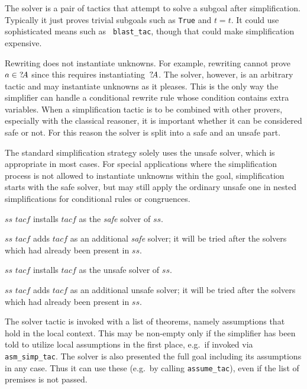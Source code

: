 The solver is a pair of tactics that attempt to solve a subgoal after
simplification.  Typically it just proves trivial subgoals such as
\texttt{True} and $t=t$.  It could use sophisticated means such as {\tt
  blast_tac}, though that could make simplification expensive.

Rewriting does not instantiate unknowns.  For example, rewriting
cannot prove $a\in {?\!A}$ since this requires
instantiating~${?\!A}$.  The solver, however, is an arbitrary tactic
and may instantiate unknowns as it pleases.  This is the only way the
simplifier can handle a conditional rewrite rule whose condition
contains extra variables.  When a simplification tactic is to be
combined with other provers, especially with the classical reasoner,
it is important whether it can be considered safe or not.  For this
reason the solver is split into a safe and an unsafe part.

The standard simplification strategy solely uses the unsafe solver,
which is appropriate in most cases.  For special applications where
the simplification process is not allowed to instantiate unknowns
within the goal, simplification starts with the safe solver, but may
still apply the ordinary unsafe one in nested simplifications for
conditional rules or congruences.

\begin{ttdescription}
  
\item[$ss$ \ttindexbold{setSSolver} $tacf$] installs $tacf$ as the
  \emph{safe} solver of $ss$.
  
\item[$ss$ \ttindexbold{addSSolver} $tacf$] adds $tacf$ as an
  additional \emph{safe} solver; it will be tried after the solvers
  which had already been present in $ss$.
  
\item[$ss$ \ttindexbold{setSolver} $tacf$] installs $tacf$ as the
  unsafe solver of $ss$.
  
\item[$ss$ \ttindexbold{addSolver} $tacf$] adds $tacf$ as an
  additional unsafe solver; it will be tried after the solvers which
  had already been present in $ss$.

\end{ttdescription}

\medskip

 The solver tactic is invoked
with a list of theorems, namely assumptions that hold in the local
context.  This may be non-empty only if the simplifier has been told
to utilize local assumptions in the first place, e.g.\ if invoked via
\texttt{asm_simp_tac}.  The solver is also presented the full goal
including its assumptions in any case.  Thus it can use these (e.g.\ 
by calling \texttt{assume_tac}), even if the list of premises is not
passed.

